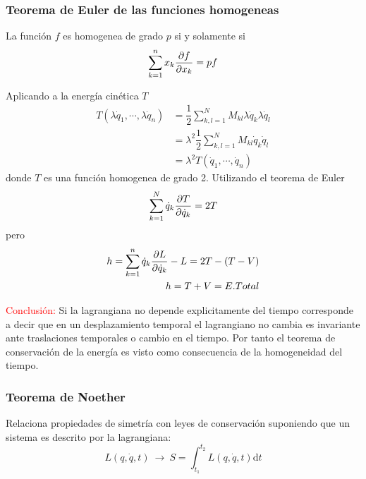 \documentclass[../main]{subfiles}
\begin{document}
\subsubsection{Teorema de Euler de las funciones homogeneas}
La función $f$ es homogenea de grado $p$ si y solamente si
\begin{equation}
    \sum_{k=1}^n x_k \pdv{f}{x_k}=pf
\end{equation}

Aplicando a la energía cinética $T$
\begin{equation}
    \begin{split}
        T(\lambda \dot{q}_1, \cdots, \lambda \dot{q}_n)&=\dfrac{1}{2}\sum_{k, l=1}^N M_{kl} \lambda \dot{q}_k \lambda \dot{q}_l \\
        &=\lambda^2\dfrac{1}{2}\sum_{k, l=1}^N M_{kl}\dot{q}_k\dot{q}_l\\
        &=\lambda^2 T(\dot{q}_1, \cdots, \dot{q}_n)
    \end{split}
\end{equation}
donde $T$ es una función homogenea de grado 2. Utilizando el teorema de Euler
\begin{equation}
    \sum_{k=1}^N \dot{q}_k \pdv{T}{\dot{q}_k}=2T
\end{equation}
pero 
\begin{equation}
    \begin{split}
        h=\sum_{k=1}^n \dot{q}_k \pdv{L}{\dot{q}_k}-L=2T-(T-V)\\
        h=T+V=E. Total
    \end{split}
\end{equation}

\textcolor{red}{Conclusión:} Si la lagrangiana no depende explicitamente del tiempo corresponde a decir que en un desplazamiento temporal el lagrangiano no cambia es invariante ante traslaciones temporales o cambio en el tiempo. Por tanto el teorema de conservación de la energía es visto como consecuencia de la homogeneidad del tiempo.

\subsubsection{Teorema de Noether}
Relaciona propiedades de simetría con leyes de conservación suponiendo que un sistema es descrito por la lagrangiana:
\begin{equation}
    L(q, \dot{q}, t) \ \rightarrow \ S=\int_{t_1}^{t_2}L(q, \dot{q}, t)\mathrm{d}t
\end{equation}
\end{document}
